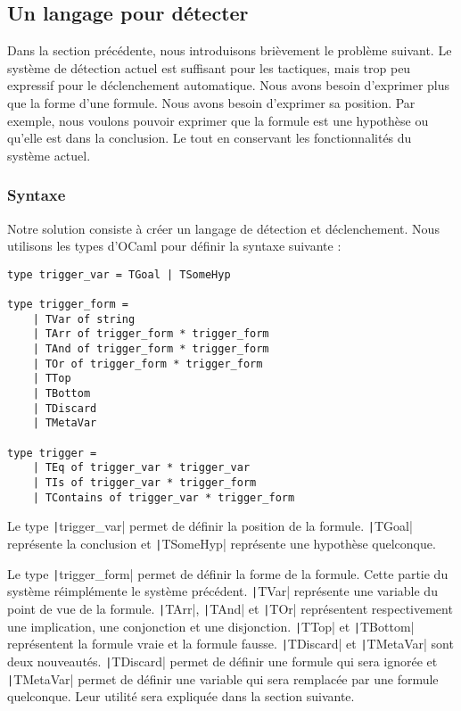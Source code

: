 \documentclass[french,titlepage]{article}
\begin{document}
\subsection{Un langage pour détecter}
Dans la section précédente, nous introduisons brièvement le problème suivant. Le système de détection actuel est suffisant pour les tactiques, mais trop peu expressif pour le déclenchement automatique. Nous avons besoin d'exprimer plus que la forme d'une formule. Nous avons besoin d'exprimer sa position. Par exemple, nous voulons pouvoir exprimer que la formule est une hypothèse ou qu'elle est dans la conclusion. Le tout en conservant les fonctionnalités du système actuel.

\subsubsection{Syntaxe}
Notre solution consiste à créer un langage de détection et déclenchement. Nous utilisons les types d'OCaml pour définir la syntaxe suivante :
\begin{verbatim}
type trigger_var = TGoal | TSomeHyp

type trigger_form =
    | TVar of string
    | TArr of trigger_form * trigger_form
    | TAnd of trigger_form * trigger_form
    | TOr of trigger_form * trigger_form
    | TTop
    | TBottom
    | TDiscard
    | TMetaVar

type trigger =
    | TEq of trigger_var * trigger_var
    | TIs of trigger_var * trigger_form
    | TContains of trigger_var * trigger_form
\end{verbatim}

Le type \texttt|trigger_var| permet de définir la position de la formule. \texttt|TGoal| représente la conclusion et \texttt|TSomeHyp| représente une hypothèse quelconque.

Le type \texttt|trigger_form| permet de définir la forme de la formule. Cette partie du système réimplémente le système précédent. \texttt|TVar| représente une variable du point de vue de la formule. \texttt|TArr|, \texttt|TAnd| et \texttt|TOr| représentent respectivement une implication, une conjonction et une disjonction. \texttt|TTop| et \texttt|TBottom| représentent la formule vraie et la formule fausse. \texttt|TDiscard| et \texttt|TMetaVar| sont deux nouveautés. \texttt|TDiscard| permet de définir une formule qui sera ignorée et \texttt|TMetaVar| permet de définir une variable qui sera remplacée par une formule quelconque. Leur utilité sera expliquée dans la section suivante.
\end{document}
